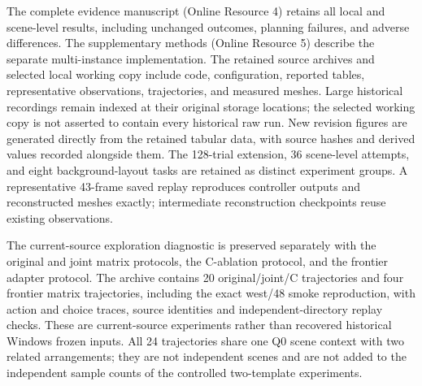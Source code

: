 \documentclass[11pt,a4paper]{article}
\begin{document}
The complete evidence manuscript (Online Resource 4) retains all local and scene-level results, including unchanged outcomes, planning failures, and adverse differences. The supplementary methods (Online Resource 5) describe the separate multi-instance implementation. The retained source archives and selected local working copy include code, configuration, reported tables, representative observations, trajectories, and measured meshes. Large historical recordings remain indexed at their original storage locations; the selected working copy is not asserted to contain every historical raw run. New revision figures are generated directly from the retained tabular data, with source hashes and derived values recorded alongside them. The 128-trial extension, 36 scene-level attempts, and eight background-layout tasks are retained as distinct experiment groups. A representative 43-frame saved replay reproduces controller outputs and reconstructed meshes exactly; intermediate reconstruction checkpoints reuse existing observations.

The current-source exploration diagnostic is preserved separately with
the original and joint matrix protocols, the C-ablation protocol, and
the frontier adapter protocol. The archive contains 20 original/joint/C
trajectories and four frontier matrix trajectories, including the exact
west/48 smoke reproduction, with action and choice traces, source
identities and independent-directory replay checks. These are
current-source experiments rather than recovered historical Windows
frozen inputs. All 24 trajectories share one Q0 scene context with two
related arrangements; they are not independent scenes and are not added
to the independent sample counts of the controlled two-template
experiments.
\end{document}
